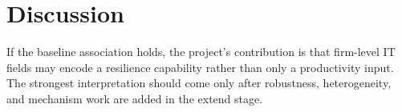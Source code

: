 \section{Discussion}

If the baseline association holds, the project's contribution is that firm-level IT fields may encode a resilience capability rather than only a productivity input. The strongest interpretation should come only after robustness, heterogeneity, and mechanism work are added in the extend stage.

